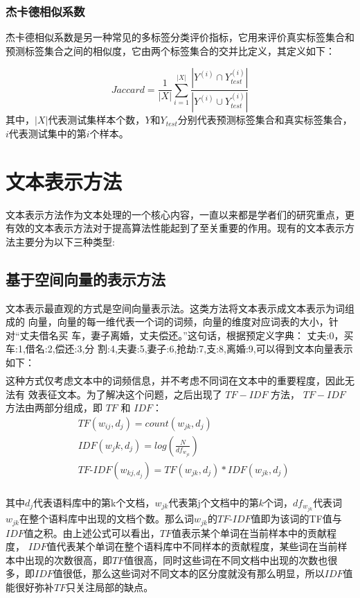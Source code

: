 \subsubsection{杰卡德相似系数}
杰卡德相似系数是另一种常见的多标签分类评价指标，它用来评价真实标签集合和预测标签集合之间的相似度，它由两个标签集合的交并比定义，其定义如下：

\begin{equation*}
Jaccard =\frac{1}{|X|}\sum_{i=1}^{|X|} \frac{ | Y^{(i)} \cap Y_{test}^{(i)} | } {|Y^{(i)} \cup Y_{test}^{(i)}|}
\end{equation*}
其中，$|X|$代表测试集样本个数，$Y$和$Y_{test}$分别代表预测标签集合和真实标签集合，$i$代表测试集中的第$i$个样本。

\section{文本表示方法}
文本表示方法作为文本处理的一个核心内容，一直以来都是学者们的研究重点，更有效的文本表示方法对于提高算法性能起到了至关重要的作用。现有的文本表示方法主要分为以下三种类型:
\subsection{基于空间向量的表示方法}
文本表示最直观的方式是空间向量表示法。这类方法将文本表示成文本表示为词组成的
向量，向量的每一维代表一个词的词频，向量的维度对应词表的大小，针对“丈夫借名买
车，妻子离婚，丈夫偿还。”这句话，根据预定义字典： {丈夫:0，买车:1,借名:2,偿还:3,分
割:4,夫妻:5,妻子:6,抢劫:7,支:8,离婚:9},可以得到文本向量表示如下：
\begin{eqnarray*}
[2,1,1,1,0,1,0,0,0,1]
\end{eqnarray*}
这种方式仅考虑文本中的词频信息，并不考虑不同词在文本中的重要程度，因此无法有
效表征文本。为了解决这个问题，之后出现了 $TF-IDF$ 方法， $TF-IDF$ 方法由两部分组成，即
$TF$ 和 $IDF$：
\begin{equation}
\begin{aligned}
    & TF(w_{ij},d_j)=count(w_{jk},d_j)\\
    & IDF(w_jk,d_j)=log(\frac{N}{df_{w_{jk}}})\\
    & TF\textrm{-}IDF(w_{kj,d_j})=TF(w_{jk},d_j)*IDF(w_{jk},d_j)\\
\end{aligned}
\end{equation}

其中$d_j$代表语料库中的第k个文档，$w_{jk}$代表第j个文档中的第$k$个词，$df_{w_{jk}}$代表词$w_{jk}$在整个语料库中出现的文档个数。那么词$w_{jk}$的$TF\textrm{-}IDF$值即为该词的TF值与$IDF$值之积。由上述公式可以看出，$TF$值表示某个单词在当前样本中的贡献程度， $IDF$值代表某个单词在整个语料库中不同样本的贡献程度，某些词在当前样本中出现的次数很高，即$TF$值很高，同时这些词在不同文档中出现的次数也很多，即$IDF$值很低，那么这些词对不同文本的区分度就没有那么明显，所以$IDF$值能很好弥补$TF$只关注局部的缺点。

